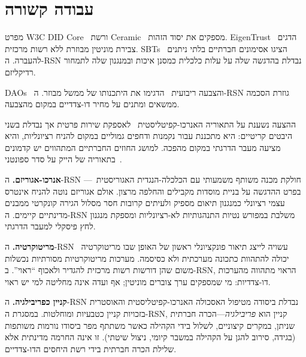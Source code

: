 \documentclass[11pt,a4paper,twocolumn]{article}
\begin{document}
\section{עבודה קשורה}

מפרט W3C DID Core~\cite{did2022} ורשת Ceramic~\cite{ceramic2023} מספקים את יסוד הזהות. EigenTrust~\cite{kamvar2003} הדגים צבירת מוניטין מבוזרת ללא רשות מרכזית. SBTs~\cite{weyl2022} הציגו אסימונים חברתיים בלתי ניתנים להעברה. ה-RSN נבדלת בהדגשה שלה על עלות כלכלית כמסנן איכות ובמנגנון שלה לתמחור רדיקליזם.

DAOs~\cite{buterin2014} והצבעה ריבועית~\cite{buterin2019} הדגימו את היתכנותו של ממשל מבוזר. ה-RSN גוזרת הסכמה ממשאים ומתנים על מחיר דו-צדדיים במקום מהצבעה.

ההצעה נשענת על התאוריה האנרכו-קפיטליסטית~\cite{rothbard1973,hoppe2001} לאספקת שירות פרטית אך נבדלת בשני היבטים קריטיים: היא מתכננת עבור נקמנות ודחפים גמוליים במקום להניח רציונליות, והיא מציעה מעבר הדרגתי במקום מהפכה. למושג החוזים החברתיים המתהווים יש קדמונים בתאוריה של הייק על סדר ספונטני~\cite{hayek1973}.

\textbf{אנרכו-אגוריזם.} ה-RSN חולקת מכנה משותף משמעותי עם הכלכלה-הנגדית האגוריסטית~\cite{konkin2006}---בפרט ההדגשה על בניית מוסדות מקבילים והחלפה מרצון. אולם אגוריזם נוטה להניח אינטרס עצמי רציונלי כמנגנון תיאום מספיק ולעיתים קרובות חסר מסלול הגירה קונקרטי ממבנים מדינתיים קיימים. ה-RSN משלבת במפורש נטיות התנהגותיות לא-רציונליות ומספקת מנגנון לחץ פיסקלי למעבר הדרגתי.

\textbf{מריטוקרטיה.} ה-RSN עשויה לייצג תיאור פונקציונלי ראשון של האופן שבו מריטוקרטיה~\cite{young1958} יכולה להתהוות כתכונה מערכתית ולא כסיסמה. מערכות מריטוקרטיות מסורתיות נכשלות משום שהן דורשות רשות מרכזית להגדיר ולאכוף ``ראוי''. ב-RSN, הראוי מתהווה מהערכות דו-צדדיות: מי שמספקים ערך צוברים מוניטין; אף ועדה אינה מחליטה למי יש ראוי.

\textbf{קניין כפריבילגיה.} ה-RSN נבדלת ביסודה מטיפול האסכולה האנרכו-קפיטליסטית והאוסטרית בזכויות קניין כטבעיות ומוחלטות. במסגרת ה-RSN, קניין הוא \emph{פריבילגיה}---הכרה חברתית שניתן, במקרים קיצוניים, לשלול בידי הקהילה כאשר משתתף מפר ביסודו נורמות משותפות (בגידה, סירוב להגן על הקהילה במשבר קיומי, ניצול שיטתי). זו אינה החרמה מדינתית אלא שלילת הכרה חברתית בידי רשת היחסים הדו-צדדיים.

\end{document}
